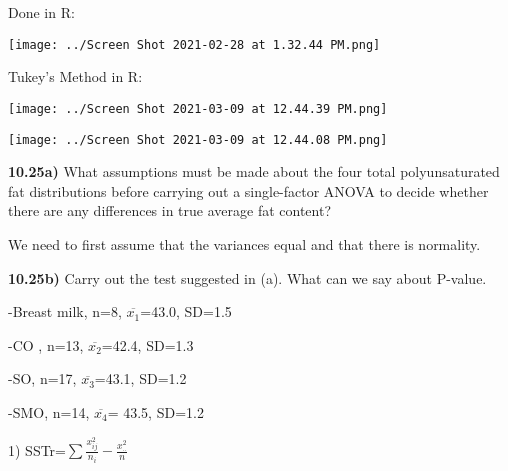 \documentclass{article}
\begin{document}
\vspace{2mm}

\newpage

Done in R:

\vspace{2mm}


\texttt{[image: ../Screen Shot 2021-02-28 at 1.32.44 PM.png]}




\vspace{2mm}

Tukey's Method in R:



\texttt{[image: ../Screen Shot 2021-03-09 at 12.44.39 PM.png]}


\vspace{2mm}

\texttt{[image: ../Screen Shot 2021-03-09 at 12.44.08 PM.png]}











\newpage
\textbf{10.25a)} What assumptions must be made about the four total polyunsaturated fat distributions before carrying out a single-factor ANOVA to decide whether there are any differences in true average fat content?

\vspace{2mm}

We need to first assume that the variances equal and that there is normality. 

\vspace{2mm}


\textbf{10.25b)} Carry out the test suggested in (a). What can we say about P-value. 


\vspace{2mm}

-Breast milk, n=8, $\overline{x_{1}}$=43.0, SD=1.5

-CO , n=13, $\overline{x_{2}}$=42.4, SD=1.3

-SO, n=17, $\overline{x_{3}}$=43.1, SD=1.2

-SMO, n=14, $\overline{x_{4}}$= 43.5, SD=1.2

\vspace{2mm}


1) SSTr=$\sum\frac{x^{2}_{ij}}{n_{i}}-\frac{x_{..}^{2}}{n}$

\vspace{2mm}
\end{document}
